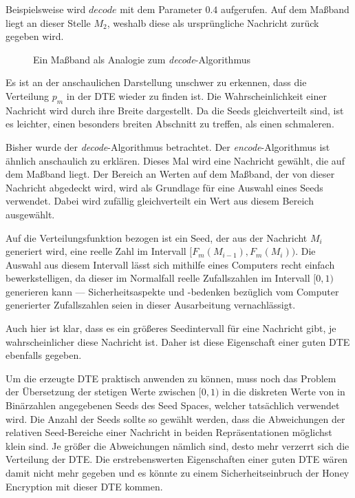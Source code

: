Beispielsweise wird $decode$ mit dem Parameter $0.4$ aufgerufen. Auf dem Maßband liegt an dieser Stelle $M_2$, weshalb diese als ursprüngliche Nachricht zurück gegeben wird.

\begin{figure}[!h]
\center
{}
\caption{Ein Maßband als Analogie zum \emph{decode}-Algorithmus}
\label{fig:decode}
\end{figure}

Es ist an der anschaulichen Darstellung unschwer zu erkennen, dass die Verteilung $p_m$ in der DTE wieder zu finden ist. Die Wahrscheinlichkeit einer Nachricht wird durch ihre Breite dargestellt. Da die Seeds gleichverteilt sind, ist es leichter, einen besonders breiten Abschnitt zu treffen, als einen schmaleren.

Bisher wurde der \emph{decode}-Algorithmus betrachtet. Der \emph{encode}-Algorithmus ist ähnlich anschaulich zu erklären. Dieses Mal wird eine Nachricht gewählt, die auf dem Maßband liegt. Der Bereich an Werten auf dem Maßband, der von dieser Nachricht abgedeckt wird, wird als Grundlage für eine Auswahl eines Seeds verwendet. Dabei wird zufällig gleichverteilt ein Wert aus diesem Bereich ausgewählt.

Auf die Verteilungsfunktion bezogen ist ein Seed, der aus der Nachricht $M_i$ generiert wird, eine reelle Zahl im Intervall $[F_m(M_{i-1}), F_m(M_i))$. Die Auswahl aus diesem Intervall lässt sich mithilfe eines Computers recht einfach bewerkstelligen, da dieser im Normalfall reelle Zufallszahlen im Intervall $[0,1)$ generieren kann --- Sicherheitsaspekte und -bedenken bezüglich vom Computer generierter Zufallszahlen seien in dieser Ausarbeitung vernachlässigt.

Auch hier ist klar, dass es ein größeres Seedintervall für eine Nachricht gibt, je wahrscheinlicher diese Nachricht ist. Daher ist diese Eigenschaft einer guten DTE ebenfalls gegeben.

Um die erzeugte DTE praktisch anwenden zu können, muss noch das Problem der Übersetzung der stetigen Werte zwischen $[0,1)$ in die diskreten Werte von in Binärzahlen angegebenen Seeds des Seed Spaces, welcher tatsächlich verwendet wird. Die Anzahl der Seeds sollte so gewählt werden, dass die Abweichungen der relativen Seed-Bereiche einer Nachricht in beiden Repräsentationen möglichst klein sind. Je größer die Abweichungen nämlich sind, desto mehr verzerrt sich die Verteilung der DTE. Die erstrebenswerten Eigenschaften einer guten DTE wären damit nicht mehr gegeben und es könnte zu einem Sicherheitseinbruch der Honey Encryption mit dieser DTE kommen.

